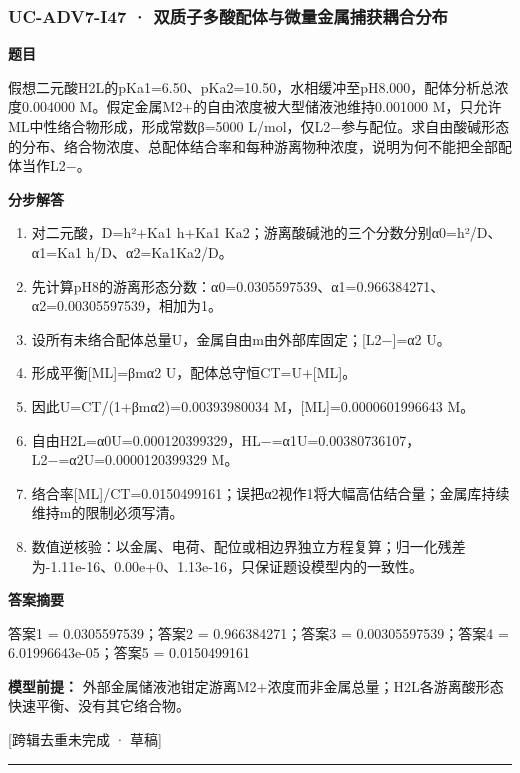 \documentclass[UTF8,11pt,a4paper]{ctexart}
\begin{document}
\subsubsection*{UC-ADV7-I47 · 双质子多酸配体与微量金属捕获耦合分布}
\noindent\textbf{题目}\par
假想二元酸H2L的pKa1=6.50、pKa2=10.50，水相缓冲至pH8.000，配体分析总浓度0.004000 M。假定金属M2+的自由浓度被大型储液池维持0.001000 M，只允许ML中性络合物形成，形成常数β=5000 L/mol，仅L2−参与配位。求自由酸碱形态的分布、络合物浓度、总配体结合率和每种游离物种浓度，说明为何不能把全部配体当作L2−。\par
\medskip\noindent\textbf{分步解答}
\begin{enumerate}
\item 对二元酸，D=h²+Ka1 h+Ka1 Ka2；游离酸碱池的三个分数分别α0=h²/D、α1=Ka1 h/D、α2=Ka1Ka2/D。
\item 先计算pH8的游离形态分数：α0=0.0305597539、α1=0.966384271、α2=0.00305597539，相加为1。
\item 设所有未络合配体总量U，金属自由m由外部库固定；[L2−]=α2 U。
\item 形成平衡[ML]=βmα2 U，配体总守恒CT=U+[ML]。
\item 因此U=CT/(1+βmα2)=0.00393980034 M，[ML]=0.0000601996643 M。
\item 自由H2L=α0U=0.000120399329，HL−=α1U=0.00380736107，L2−=α2U=0.0000120399329 M。
\item 络合率[ML]/CT=0.0150499161；误把α2视作1将大幅高估结合量；金属库持续维持m的限制必须写清。
\item 数值逆核验：以金属、电荷、配位或相边界独立方程复算；归一化残差为-1.11e-16、0.00e+0、1.13e-16，只保证题设模型内的一致性。
\end{enumerate}
\noindent\textbf{答案摘要}\par
答案1 = 0.0305597539；答案2 = 0.966384271；答案3 = 0.00305597539；答案4 = 6.01996643e-05；答案5 = 0.0150499161\par
\noindent\textbf{模型前提：}
外部金属储液池钳定游离M2+浓度而非金属总量；H2L各游离酸形态快速平衡、没有其它络合物。\par
\noindent\textcolor{red!65!black}{[跨辑去重未完成 · 草稿]} \par
\medskip\hrule\medskip
{}
\end{document}
